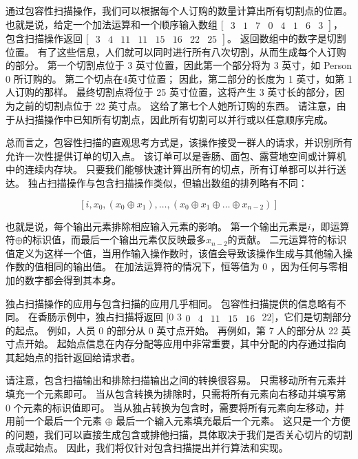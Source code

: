 通过包容性扫描操作，我们可以根据每个人订购的数量计算出所有切割点的位置。 也就是说，给定一个加法运算和一个顺序输入数组 [ $\left.\begin{array}{llllllll}3 & 1 & 7 & 0 & 4 & 1 & 6 & 3\end{array}\right]$， 包含扫描操作返回 [ $\left.\begin{array}{llllllllll}3 & 4 & 11 & 11 & 15 & 16 & 22 & 25\end{array}\right]$。 返回数组中的数字是切割位置。 有了这些信息，人们就可以同时进行所有八次切割，从而生成每个人订购的部分。 第一个切割点位于 3 英寸位置，因此第一个部分将为 3 英寸，如 Person 0 所订购的。 第二个切点在4英寸位置； 因此，第二部分的长度为 1 英寸，如第 1 人订购的那样。 最终切割点将位于 25 英寸位置，这将产生 3 英寸长的部分，因为之前的切割点位于 22 英寸点。 这给了第七个人她所订购的东西。 请注意，由于从扫描操作中已知所有切割点，因此所有切割可以并行或以任意顺序完成。

总而言之，包容性扫描的直观思考方式是，该操作接受一群人的请求，并识别所有允许一次性提供订单的切入点。 该订单可以是香肠、面包、露营地空间或计算机中的连续内存块。 只要我们能够快速计算出所有的切点，所有订单都可以并行送达。 独占扫描操作与包含扫描操作类似，但输出数组的排列略有不同：

$$
\left[i, x_{0},\left(x_{0} \oplus x_{1}\right), \ldots,\left(x_{0} \oplus x_{1} \oplus \ldots \oplus x_ {n-2}\right)\right]
$$

也就是说，每个输出元素排除相应输入元素的影响。 第一个输出元素是$i$，即运算符$\oplus$的标识值，而最后一个输出元素仅反映最多$x_{n-2}$的贡献。 二元运算符的标识值定义为这样一个值，当用作输入操作数时，该值会导致该操作生成与其他输入操作数的值相同的输出值。 在加法运算符的情况下，恒等值为 0 ，因为任何与零相加的数字都会得到其本身。

独占扫描操作的应用与包含扫描的应用几乎相同。 包容性扫描提供的信息略有不同。 在香肠示例中，独占扫描将返回 [0 $3 \begin{array}{lllll}0 & 4 & 11 & 15 & 16\end{array}$ 22]，它们是切割部分的起点。 例如，人员 0 的部分从 0 英寸点开始。 再例如，第 7 人的部分从 22 英寸点开始。 起始点信息在内存分配等应用中非常重要，其中分配的内存通过指向其起始点的指针返回给请求者。

请注意，包含扫描输出和排除扫描输出之间的转换很容易。 只需移动所有元素并填充一个元素即可。 当从包含转换为排除时，只需将所有元素向右移动并填写第 0 个元素的标识值即可。 当从独占转换为包含时，需要将所有元素向左移动，并用前一个最后一个元素 $\oplus$ 最后一个输入元素填充最后一个元素。 这只是一个方便的问题，我们可以直接生成包含或排他扫描，具体取决于我们是否关心切片的切割点或起始点。 因此，我们将仅针对包含扫描提出并行算法和实现。

